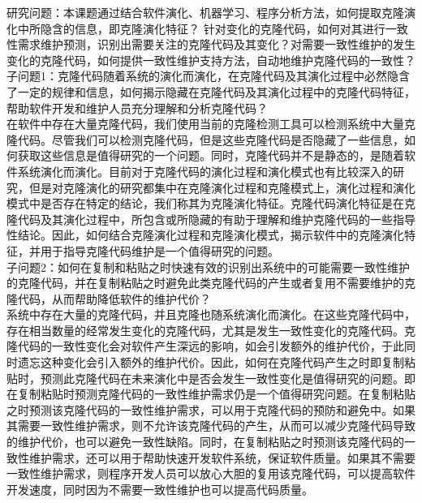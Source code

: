 研究问题：本课题通过结合软件演化、机器学习、程序分析方法，如何提取克隆演化中所隐含的信息，即克隆演化特征？ 针对变化的克隆代码，如何对其进行一致性需求维护预测，识别出需要关注的克隆代码及其变化？对需要一致性维护的发生变化的克隆代码，如何提供一致性维护支持方法，自动地维护克隆代码的一致性？\\

子问题1：克隆代码随着系统的演化而演化，在克隆代码及其演化过程中必然隐含了一定的规律和信息，如何揭示隐藏在克隆代码及其演化过程中的克隆代码特征，帮助软件开发和维护人员充分理解和分析克隆代码？ \\

在软件中存在大量克隆代码，我们使用当前的克隆检测工具可以检测系统中大量克隆代码。尽管我们可以检测克隆代码，但是这些克隆代码是否隐藏了一些信息，如何获取这些信息是值得研究的一个问题。同时，克隆代码并不是静态的，是随着软件系统演化而演化。目前对于克隆代码的演化过程和演化模式也有比较深入的研究，但是对克隆演化的研究都集中在克隆演化过程和克隆模式上，演化过程和演化模式中是否存在特定的结论，我们称其为克隆演化特征。克隆代码演化特征是在克隆代码及其演化过程中，所包含或所隐藏的有助于理解和维护克隆代码的一些指导性结论。因此，如何结合克隆演化过程和克隆演化模式，揭示软件中的克隆演化特征，并用于指导克隆代码维护是一个值得研究的问题。\\

子问题2：如何在复制和粘贴之时快速有效的识别出系统中的可能需要一致性维护的克隆代码，并在复制粘贴之时避免此类克隆代码的产生或者复用不需要维护的克隆代码，从而帮助降低软件的维护代价？\\

系统中存在大量的克隆代码，并且克隆也随系统演化而演化。在这些克隆代码中，存在相当数量的经常发生变化的克隆代码，尤其是发生一致性变化的克隆代码。克隆代码的一致性变化会对软件产生深远的影响，如会引发额外的维护代价，于此同时遗忘这种变化会引入额外的维护代价。因此，如何在克隆代码产生之时即复制粘贴时，预测此克隆代码在未来演化中是否会发生一致性变化是值得研究的问题。即在复制粘贴时预测克隆代码的一致性维护需求仍是一个值得研究问题。在复制粘贴之时预测该克隆代码的一致性维护需求，可以用于克隆代码的预防和避免中。如果其需要一致性维护需求，则不允许该克隆代码的产生，从而可以减少克隆代码导致的维护代价，也可以避免一致性缺陷。同时，在复制粘贴之时预测该克隆代码的一致性维护需求，还可以用于帮助快速开发软件系统，保证软件质量。如果其不需要一致性维护需求，则程序开发人员可以放心大胆的复用该克隆代码，可以提高软件开发速度，同时因为不需要一致性维护也可以提高代码质量。\\

